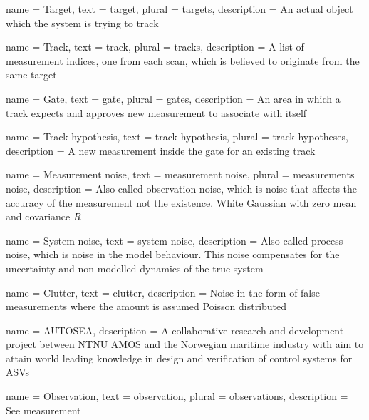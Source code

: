 {
	name 		= Target,
	text 		= target,
	plural		= targets,
	description = {An actual object which the system is trying to track}
}

{
	name 		= Track,
	text 		= track,
	plural 		= tracks,
	description = {A list of measurement indices, one from each scan, which is believed to originate from the same target}
}

{
	name 		= Gate,
	text 		= gate,
	plural		= gates,
	description = {An area in which a track expects and approves new measurement to associate with itself}
}

{
	name 		= {Track hypothesis},
	text 		= {track hypothesis},
	plural		= {track hypotheses},
	description = {A new measurement inside the gate for an existing track}
}

{
	name 		= {Measurement noise},
	text 		= {measurement noise},
	plural		= {measurements noise},
	description = {Also called observation noise, which is noise that affects the accuracy of the measurement not the existence. White Gaussian with zero mean and covariance \(R\)}
}

{
	name 		= {System noise},
	text 		= {system noise}, 
	description = {Also called process noise, which is noise in the model behaviour. This noise compensates for the uncertainty and non-modelled dynamics of the true system}
}

{
	name 		= Clutter,
	text 		= clutter,
	description = {Noise in the form of false measurements where the amount is assumed Poisson distributed}
}

{
	name = {AUTOSEA},
	description = {A collaborative research and development project between NTNU AMOS  and the Norwegian maritime industry with aim to attain world leading knowledge in design and verification of control systems for ASVs}
}

{
	name 		= Observation,
	text 		= observation,
	plural 		= observations,
	description = {See \Gls{measurement}}
}